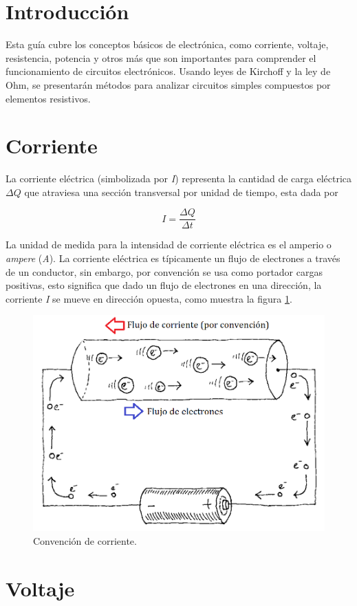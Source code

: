 \documentclass[11pt,letterpaper,notitlepage]{article}
\begin{document}
\section{Introducción}

Esta guía cubre los conceptos básicos de electrónica, como corriente, voltaje, resistencia, potencia y otros más que son importantes para comprender el funcionamiento de circuitos electrónicos. Usando leyes de Kirchoff y la ley de Ohm, se presentarán métodos para analizar circuitos simples compuestos por elementos resistivos.

\section{Corriente}

La corriente eléctrica (simbolizada por \textit{I}) representa la cantidad de carga eléctrica $\Delta Q$ que atraviesa una sección transversal por unidad de tiempo, esta dada por

\begin{equation}
I=\frac{\Delta Q}{\Delta t}
\end{equation}

La unidad de medida para la intensidad de corriente eléctrica es el amperio o \textit{ampere} (\textit{A}). La corriente eléctrica es típicamente un flujo de electrones a través de un conductor, sin embargo, por convención se usa como portador cargas positivas, esto significa que dado un flujo de electrones en una dirección, la corriente \textit{I} se mueve en dirección opuesta, como muestra la figura \ref{corriente}.

\begin{figure}[H]
\begin{center}
	\includegraphics[scale=0.3]{corriente}
	\caption{Convención de corriente.}
	\label{corriente}
\end{center}
\end{figure}

\section{Voltaje}
\end{document}
